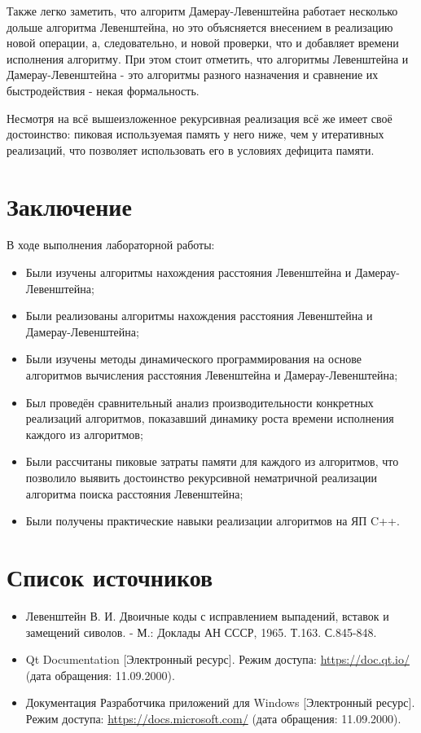 \documentclass[12pt]{report}
\begin{document}
Также легко заметить, что алгоритм Дамерау-Левенштейна работает несколько дольше алгоритма Левенштейна, но это объясняется внесением в реализацию новой операции, а, следовательно, и новой проверки, что и добавляет времени исполнения алгоритму. При этом стоит отметить, что алгоритмы Левенштейна и Дамерау-Левенштейна - это алгоритмы разного назначения и сравнение их быстродействия - некая формальность.

Несмотря на всё вышеизложенное рекурсивная реализация всё же имеет своё достоинство: пиковая используемая память у него ниже, чем у итеративных реализаций, что позволяет использовать его в условиях дефицита памяти.

\chapter*{Заключение}
В ходе выполнения лабораторной работы:
\begin{itemize}
\item Были изучены алгоритмы нахождения расстояния Левенштейна и Дамерау-Левенштейна;
\item Были реализованы алгоритмы нахождения расстояния Левенштейна и Дамерау-Левенштейна;
\item Были изучены методы динамического программирования на основе алгоритмов вычисления расстояния Левенштейна и Дамерау-Левенштейна;
\item Был проведён сравнительный анализ производительности конкретных реализаций алгоритмов, показавший динамику роста времени исполнения каждого из алгоритмов;
\item Были рассчитаны пиковые затраты памяти для каждого из алгоритмов, что позволило выявить достоинство рекурсивной нематричной реализации алгоритма поиска расстояния Левенштейна;
\item Были получены практические навыки реализации алгоритмов на ЯП C++.
\end{itemize}

\chapter*{Список источников}
\begin{itemize}
\item Левенштейн В. И. Двоичные коды с исправлением выпадений, вставок и замещений сиволов. - М.: Доклады АН СССР, 1965. Т.163. С.845-848.
\item Qt Documentation [Электронный ресурс]. Режим доступа: \url{https://doc.qt.io/} (дата обращения: 11.09.2000).
\item Документация Разработчика приложений для Windows [Электронный ресурс]. Режим доступа: \url{https://docs.microsoft.com/} (дата обращения: 11.09.2000).
\end{itemize}
\end{document}
